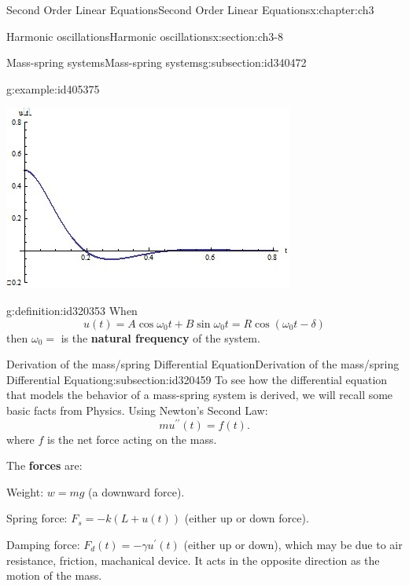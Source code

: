 \documentclass[oneside,10pt,]{book}
\newcommand{\terminology}[1]{\textbf{#1}}
\numberwithin{equation}{section}
\numberwithin{equation}{section}
\begin{document}
\begin{chapterptx}{Second Order Linear Equations}{}{Second Order Linear Equations}{}{}{x:chapter:ch3}
\begin{sectionptx}{Harmonic oscillations}{}{Harmonic oscillations}{}{}{x:section:ch3-8}
\begin{subsectionptx}{Mass-spring systems}{}{Mass-spring systems}{}{}{g:subsection:id340472}
\begin{example}{}{g:example:id405375}
\begin{image}{0}{1}{0}
\includegraphics[width=\linewidth]{images/Spring3.jpg}
\end{image}%
\end{example}
\begin{definition}{}{g:definition:id320353}%
When%
\begin{equation*}
u(t)=A\cos\omega_{0}t+B\sin\omega_{0}t=R\cos\left(\omega_{0}t-\delta\right)
\end{equation*}
then \(\omega_{0}=\) is the \terminology{natural frequency} of the system.%
\end{definition}
\end{subsectionptx}
%
%
\typeout{************************************************}
\typeout{************************************************}
%
\begin{subsectionptx}{Derivation of the mass\slash{}spring Differential Equation}{}{Derivation of the mass\slash{}spring Differential Equation}{}{}{g:subsection:id320459}
To see how the differential equation that models the behavior of a mass-spring system is derived, we will recall some basic facts from Physics. Using Newton's Second Law:%
\begin{equation*}
mu^{\prime\prime}(t)=f(t).
\end{equation*}
where \(f\) is the net force acting on the mass.%
\par
The \terminology{forces} are:%
\par
Weight: \(w=mg\) (a downward force).%
\par
Spring force: \(F_{s}=-k\left(L+u(t)\right)\) (either up or down force).%
\par
Damping force: \(F_{d}(t)=-\gamma u^{\prime}(t)\) (either up or down), which may be due to air resistance, friction, machanical device. It acts in the opposite direction as the motion of the mass.%

\end{subsectionptx}
\end{sectionptx}
\end{chapterptx}
\end{document}
